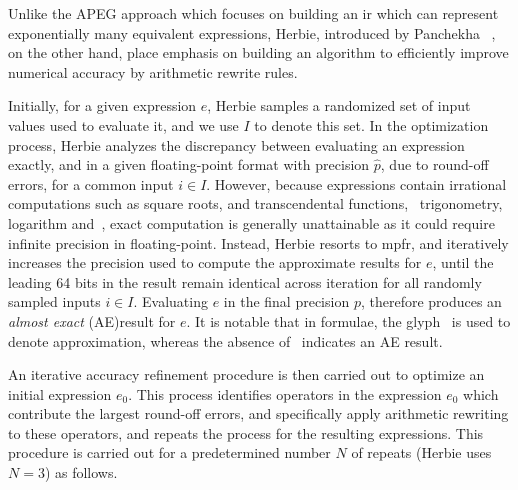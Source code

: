 Unlike the APEG approach which focuses on building an \gls{ir} which can
represent exponentially many equivalent expressions, Herbie, introduced by
Panchekha \etal~\cite{panchekha15}, on the other hand, place emphasis on
building an algorithm to efficiently improve numerical accuracy by arithmetic
rewrite rules.

Initially, for a given expression $e$, Herbie samples a randomized set of
input values used to evaluate it, and we use $I$ to denote this set.  In the
optimization process, Herbie analyzes the discrepancy between evaluating
an expression exactly, and in a given floating-point format with precision
$\hat{p}$, due to round-off errors, for a common input $i \in I$.  However,
because expressions contain irrational computations such as square roots,
and transcendental functions, \eg~trigonometry, logarithm and~\etc, exact
computation is generally unattainable as it could require infinite precision
in floating-point.  Instead, Herbie resorts to \gls{mpfr}, and iteratively
increases the precision used to compute the approximate results for $e$, until
the leading 64 bits in the result remain identical across iteration for all
randomly sampled inputs $i \in I$.  Evaluating $e$ in the final precision $p$,
therefore produces an \emph{almost exact} (AE)\footnotemark[3] result for
$e$.  It is notable that in formulae, the glyph $\hat{\,}$ is used to denote
approximation, whereas the absence of $\hat{\,}$ indicates an AE result.

An iterative accuracy refinement procedure is then carried out to optimize an
initial expression $e_0$.  This process identifies operators in the expression
$e_0$ which contribute the largest round-off errors, and specifically apply
arithmetic rewriting to these operators, and repeats the process for the
resulting expressions.  This procedure is carried out for a predetermined
number $N$ of repeats (Herbie uses $N = 3$) as follows.


